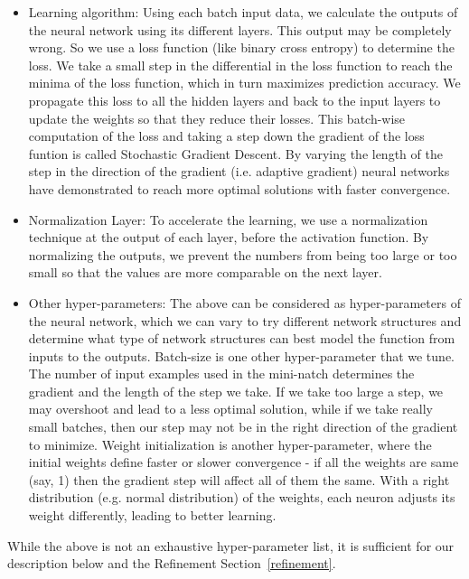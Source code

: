 \documentclass[runningheads,a4paper]{IEEEtran}
\begin{document}
\begin{itemize}
\item Learning algorithm: Using each batch input data, we calculate the outputs of the neural network using its different layers. This output may be completely wrong. So we use a loss function (like binary cross entropy) to determine the loss. We take a small step in the differential in the loss function to reach the minima of the loss function, which in turn maximizes prediction accuracy. We propagate this loss to all the hidden layers and back to the input layers to update the weights so that they reduce their losses. This batch-wise computation of the loss and taking a step down the gradient of the loss funtion is called Stochastic Gradient Descent. By varying the length of the step in the direction of the gradient (i.e. adaptive gradient) neural networks have demonstrated to reach more optimal solutions with faster convergence. 

\item Normalization Layer:
To accelerate the learning, we use a normalization technique at the output of each layer, before the activation function. By normalizing the outputs, we prevent the numbers from being too large or too small so that the values are more comparable on the next layer. 

\item Other hyper-parameters: The above can be considered as hyper-parameters of the neural network, which we can vary to try different network structures and determine what type of network structures can best model the function from inputs to the outputs. Batch-size is one other hyper-parameter that we tune. The number of input examples used in the mini-natch determines the gradient and the length of the step we take. If we take too large a step, we may overshoot and lead to a less optimal solution, while if we take really small batches, then our step may not be in the right direction of the gradient to minimize. Weight initialization is another hyper-parameter, where the initial weights define faster or slower convergence - if all the weights are same (say, 1) then the gradient step will affect all of them the same. With a right distribution (e.g. normal distribution) of the weights, each neuron adjusts its weight differently, leading to better learning.
\end{itemize} 
While the above is not an exhaustive hyper-parameter list, it is sufficient for our description below and the Refinement Section~\ref{refinement}. 
\end{document}
